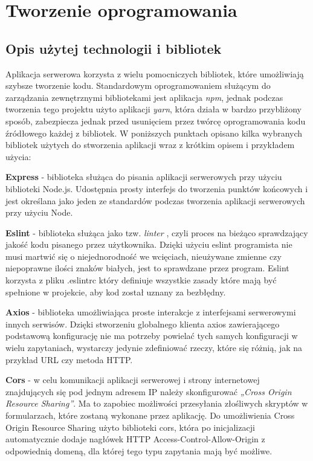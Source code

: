 \chapter{Tworzenie oprogramowania}
\label{cha:tworzenie_oprogramowania}

\section{Opis użytej technologii i bibliotek}

Aplikacja serwerowa korzysta z wielu pomocniczych bibliotek, które umożliwiają szybsze tworzenie kodu. Standardowym oprogramowaniem służącym do zarządzania zewnętrznymi bibliotekami jest aplikacja \textit{npm}, jednak podczas tworzenia tego projektu użyto aplikacji \textit{yarn}, która działa w bardzo przybliżony sposób, zabezpiecza jednak przed usunięciem przez twórcę oprogramowania kodu źródłowego każdej z bibliotek. W poniższych punktach opisano kilka wybranych bibliotek użytych do stworzenia aplikacji wraz z krótkim opisem i przykładem użycia:\newline

\textbf{Express} - biblioteka służąca do pisania aplikacji serwerowych przy użyciu biblioteki Node.js. Udostępnia prosty interfejs do tworzenia punktów końcowych i jest określana jako jeden ze standardów podczas tworzenia aplikacji serwerowych przy użyciu Node.\newline

\textbf{Eslint} - biblioteka służąca jako tzw. \textit{linter} , czyli proces na bieżąco sprawdzający jakość kodu pisanego przez użytkownika. Dzięki użyciu eslint programista nie musi martwić się o niejednorodność we wcięciach, nieużywane zmienne czy niepoprawne ilości znaków białych, jest to sprawdzane przez program. Eslint korzysta z pliku .eslintrc który definiuje wszystkie zasady które mają być spełnione w projekcie, aby kod został uznany za bezbłędny.\newline

\textbf{Axios} - biblioteka umożliwiająca proste interakcje z interfejsami serwerowymi innych serwisów. Dzięki stworzeniu globalnego klienta axios zawierającego podstawową konfigurację nie ma potrzeby powielać tych samych konfiguracji w wielu zapytaniach, wystarczy jedynie zdefiniować rzeczy, które się różnią, jak na przykład URL czy metoda HTTP.\newline

\textbf{Cors} - w celu komunikacji aplikacji serwerowej i strony internetowej znajdujących się pod jednym adresem IP należy skonfigurować \textit{„Cross Origin Resource Sharing”}. Ma to zapobiec możliwości przesyłania złośliwych skryptów w formularzach, które zostaną wykonane przez aplikację. Do umożliwienia Cross Origin Resource Sharing użyto biblioteki cors, która po inicjalizacji automatycznie dodaje nagłówek HTTP Access-Control-Allow-Origin z odpowiednią domeną, dla której tego typu zapytania mają być możliwe.\newline

